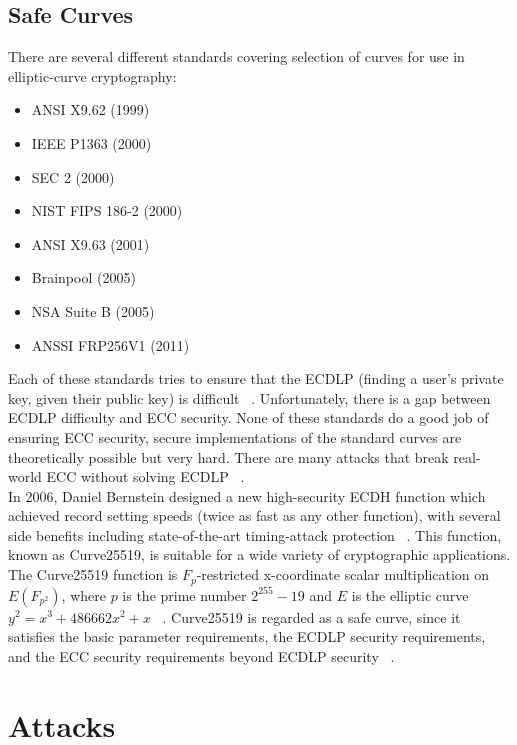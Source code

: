 \documentclass[11pt]{article}
\begin{document}
\subsection{Safe Curves} \label{Safe Curves}
There are several different standards covering selection of curves for use in elliptic-curve cryptography:
\begin{itemize}
    \item ANSI X9.62 (1999)
    \item IEEE P1363 (2000)
    \item SEC 2 (2000)
    \item NIST FIPS 186-2 (2000)
    \item ANSI X9.63 (2001)
    \item Brainpool (2005)
    \item NSA Suite B (2005)
    \item ANSSI FRP256V1 (2011)
\end{itemize}
Each of these standards tries to ensure that the ECDLP (finding a user's private key, given their public key) is difficult ~\cite{bernstein2013safecurves}. 
Unfortunately, there is a gap between ECDLP difficulty and ECC security. 
None of these standards do a good job of ensuring ECC security, 
secure implementations of the standard curves are theoretically possible but very hard. 
There are many attacks that break real-world ECC without solving ECDLP ~\cite{bernstein2013safecurves}.
\\
In 2006, Daniel Bernstein designed a new high-security ECDH function which achieved record setting speeds (twice as fast as any other function), 
with several side benefits including state-of-the-art timing-attack protection ~\cite{10.1007/11745853_14}. 
This function, known as Curve25519, is suitable for a wide variety of cryptographic applications. 
The Curve25519 function is $F_p$-restricted x-coordinate scalar multiplication on $E(F_{p^2})$, 
where $p$ is the prime number $2^{255} - 19$ and $E$ is the elliptic curve $y^2 = x^3 + 486662x^2 + x$ ~\cite{10.1007/11745853_14}.
Curve25519 is regarded as a safe curve, since it satisfies the basic parameter requirements, the ECDLP security requirements, 
and the ECC security requirements beyond ECDLP security ~\cite{bernstein2013safecurves}.


\section{Attacks} \label{Attacks}
\end{document}
